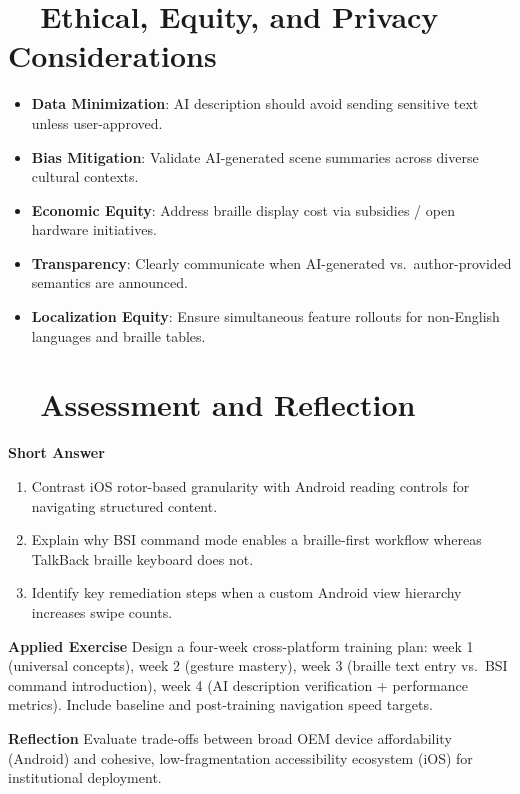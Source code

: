 \section{~~Ethical, Equity, and Privacy Considerations}
\label{sec:sr26-ethics}
\begin{itemize}
	\item \textbf{Data Minimization}: AI description should avoid sending sensitive text unless user-approved.
	\item \textbf{Bias Mitigation}: Validate AI-generated scene summaries across diverse cultural contexts.
	\item \textbf{Economic Equity}: Address braille display cost via subsidies / open hardware initiatives.
	\item \textbf{Transparency}: Clearly communicate when AI-generated vs.\ author-provided semantics are announced.
	\item \textbf{Localization Equity}: Ensure simultaneous feature rollouts for non-English languages and braille tables.
\end{itemize}

\section{~~Assessment and Reflection}
\label{sec:sr26-assessment}
\textbf{Short Answer}
\begin{enumerate}
	\item Contrast iOS rotor-based granularity with Android reading controls for navigating structured content.
	\item Explain why BSI command mode enables a braille-first workflow whereas TalkBack braille keyboard does not.
	\item Identify key remediation steps when a custom Android view hierarchy increases swipe counts.
\end{enumerate}

\textbf{Applied Exercise} Design a four-week cross-platform training plan: week 1 (universal concepts), week 2 (gesture mastery), week 3 (braille text entry vs.\ BSI command introduction), week 4 (AI description verification + performance metrics). Include baseline and post-training navigation speed targets.

\textbf{Reflection} Evaluate trade-offs between broad OEM device affordability (Android) and cohesive, low-fragmentation accessibility ecosystem (iOS) for institutional deployment.

